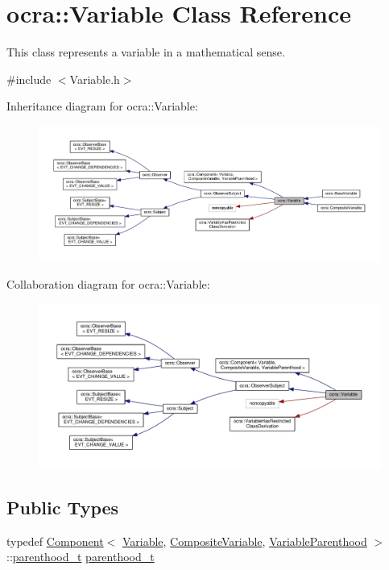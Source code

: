 \hypertarget{classocra_1_1Variable}{}\section{ocra\+:\+:Variable Class Reference}
\label{classocra_1_1Variable}


This class represents a variable in a mathematical sense.  




{\ttfamily \#include $<$Variable.\+h$>$}



Inheritance diagram for ocra\+:\+:Variable\+:
\nopagebreak
\begin{figure}[H]
\begin{center}
\leavevmode
\includegraphics[width=350pt]{de/d84/classocra_1_1Variable__inherit__graph}
\end{center}
\end{figure}


Collaboration diagram for ocra\+:\+:Variable\+:
\nopagebreak
\begin{figure}[H]
\begin{center}
\leavevmode
\includegraphics[width=350pt]{d5/d92/classocra_1_1Variable__coll__graph}
\end{center}
\end{figure}
\subsection*{Public Types}
\begin{DoxyCompactItemize}
\item 
typedef \hyperlink{classocra_1_1Component}{Component}$<$ \hyperlink{classocra_1_1Variable}{Variable}, \hyperlink{classocra_1_1CompositeVariable}{Composite\+Variable}, \hyperlink{structocra_1_1VariableParenthood}{Variable\+Parenthood} $>$\+::\hyperlink{classocra_1_1Variable_a88444b2124cf5aab069f46734822f31f}{parenthood\+\_\+t} \hyperlink{classocra_1_1Variable_a88444b2124cf5aab069f46734822f31f}{parenthood\+\_\+t}
\end{DoxyCompactItemize}
